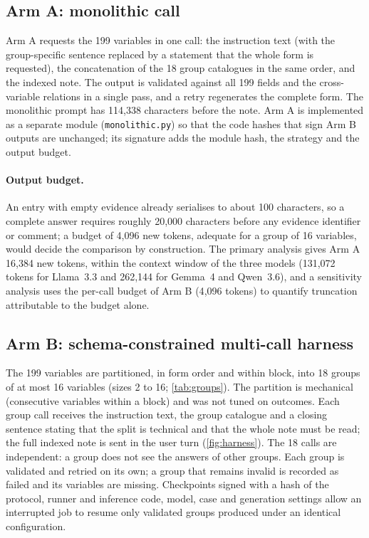 \subsection{Arm A: monolithic call}\label{sec:mono}

Arm A requests the 199 variables in one call: the instruction text (with the group-specific sentence
replaced by a statement that the whole form is requested), the concatenation of the 18 group catalogues
in the same order, and the indexed note. The output is validated against all 199 fields and the
cross-variable relations in a single pass, and a retry regenerates the complete form. The monolithic
prompt has 114{,}338 characters before the note. Arm A is implemented as a separate module
(\texttt{monolithic.py}) so that the code hashes that sign Arm B outputs are unchanged; its signature adds
the module hash, the strategy and the output budget.

\paragraph{Output budget.} An entry with empty evidence already serialises to about 100 characters, so a
complete answer requires roughly 20{,}000 characters before any evidence identifier or comment; a budget of
4{,}096 new tokens, adequate for a group of 16 variables, would decide the comparison by construction. The
primary analysis gives Arm A 16{,}384 new tokens, within the context window of the three models (131{,}072
tokens for Llama~3.3 and 262{,}144 for Gemma~4 and Qwen~3.6), and a sensitivity analysis uses the per-call
budget of Arm B (4{,}096 tokens) to quantify truncation attributable to the budget alone.

\subsection{Arm B: schema-constrained multi-call harness}\label{sec:harness}

The 199 variables are partitioned, in form order and within block, into 18 groups of at most 16
variables (sizes 2 to 16; \cref{tab:groups}). The partition is mechanical (consecutive variables within
a block) and was not tuned on outcomes. Each group call receives the instruction text, the group catalogue
and a closing sentence stating that the split is technical and that the whole note must be read; the
full indexed note is sent in the user turn (\cref{fig:harness}). The 18 calls are independent: a group
does not see the answers of other groups. Each group is validated and retried on its own; a group that
remains invalid is recorded as failed and its variables are missing. Checkpoints signed with a hash of the
protocol, runner and inference code, model, case and generation settings allow an interrupted job to
resume only validated groups produced under an identical configuration.

